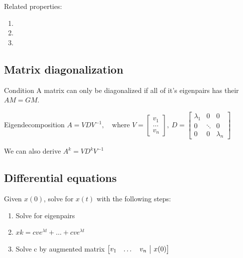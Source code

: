 \documentclass{article}
\makeatletter
\newenvironment{amatrix}[1]{%
  \left[\begin{array}{@{}*{#1}{c}|c@{}}
}{%
  \end{array}\right]
}
\makeatother
\begin{document}
Related properties:

\begin{enumerate}
	\item {}
	\item {}
	\item {}
\end{enumerate}

\subsection{Matrix diagonalization}
\label{sec:diag}
\begin{propBox}[]{Condition}
    A matrix can only be diagonalized if all of it's eigenpairs has their $AM = GM$.
\end{propBox}
\begin{knBox}[]{Eigendecomposition}
    $A=VDV^{-1},\quad\text{where }V=\begin{bmatrix}
        v_1\\\dots\\v_n
    \end{bmatrix},\ D=\begin{bmatrix}
        \lambda_1&0&0\\0&\ddots&0\\0&0&\lambda_n
    \end{bmatrix}$

    We can also derive $A^k=VD^kV^{-1}$
\end{knBox}

\subsection{Differential equations}
\label{sec:diff}
Given $x(0)$, solve for $x(t)$ with the following steps:
\begin{enumerate}
	\item Solve for eigenpairs
    \item $xk = cve^{\lambda t} + \dots + cve^{\lambda t}$
    \item Solve c by augmented matrix $\begin{amatrix}{3}
        v_1&\dots&v_n&x(0)
    \end{amatrix}$
\end{enumerate}
\end{document}
